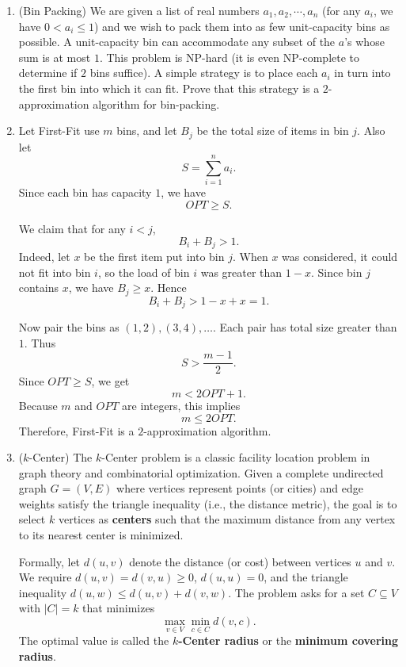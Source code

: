 \documentclass[12pt,a4paper]{article}
\makeatletter
\newtheorem*{solution}{Solution}
\theoremstyle{definition}
\renewenvironment{solution}[1][Solution] {\par\pushQED{\qed}\normalfont\topsep6\p@\@plus6\p@\relax\trivlist\item[\hskip\labelsep\bfseries#1\@addpunct{.}]\ignorespaces}{\popQED\endtrivlist\@endpefalse} \makeatother
\makeatother
\begin{document}
\begin{enumerate}
  \item {\color{purple}(Bin Packing)} We are given a list of real numbers $a_1, a_2, \cdots , a_n$ (for any $a_i$, we have $0 < a_i\leq 1$) and we wish to pack them into as few unit-capacity bins as possible. A unit-capacity bin can accommodate any subset of the $a$’s whose sum is at most $1$. This problem is NP-hard (it is even NP-complete to determine if $2$ bins suffice). A simple strategy is to place each $a_i$ in turn into the first bin into which it can fit. Prove that this strategy is a $2$-approximation algorithm for bin-packing.

    \begin{solution}
    Let First-Fit use \(m\) bins, and let \(B_j\) be the total size of items in bin \(j\). Also let
    \[
    S=\sum_{i=1}^n a_i .
    \]
    Since each bin has capacity \(1\), we have
    \[
    OPT\ge S.
    \]
    
    We claim that for any \(i<j\),
    \[
    B_i+B_j>1.
    \]
    Indeed, let \(x\) be the first item put into bin \(j\). When \(x\) was considered, it could not fit into bin \(i\), so the load of bin \(i\) was greater than \(1-x\). Since bin \(j\) contains \(x\), we have \(B_j\ge x\). Hence
    \[
    B_i+B_j>1-x+x=1.
    \]
    
    Now pair the bins as \((1,2),(3,4),\ldots\). Each pair has total size greater than \(1\). Thus
    \[
    S>\frac{m-1}{2}.
    \]
    Since \(OPT\ge S\), we get
    \[
    m<2OPT+1.
    \]
    Because \(m\) and \(OPT\) are integers, this implies
    \[
    m\le 2OPT.
    \]
    Therefore, First-Fit is a \(2\)-approximation algorithm.
    \end{solution}


  \item {\color{purple}($k$-Center)} The $k$-Center problem is a classic facility location problem in graph theory and combinatorial optimization. Given a complete undirected graph $G = (V, E)$ where vertices represent points (or cities) and edge weights satisfy the triangle inequality (i.e., the distance metric), the goal is to select $k$ vertices as \textbf{centers} such that the maximum distance from any vertex to its nearest center is minimized.

    Formally, let $d(u,v)$ denote the distance (or cost) between vertices $u$ and $v$. We require $d(u,v) = d(v,u) \ge 0$, $d(u,u)=0$, and the triangle inequality $d(u,w) \le d(u,v)+d(v,w)$. The problem asks for a set $C \subseteq V$ with $|C| = k$ that minimizes
    \[
    \max_{v \in V} \min_{c \in C} d(v,c).
    \]
    The optimal value is called the \textbf{$k$-Center radius} or the \textbf{minimum covering radius}.


\end{enumerate}
\end{document}

